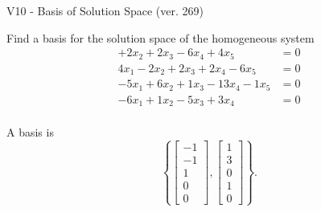 \begin{exercise}
  \begin{exerciseTitle}V10 - Basis of Solution Space (ver. 269)\end{exerciseTitle}
  \begin{exerciseStatement}
    Find a basis for the solution space of the homogeneous system 
\begin{align*}
 + 2 x_ 2 + 2 x_ 3 -6 x_ 4 + 4 x_ 5 &= 0  \\ 
  4 x_ 1 -2 x_ 2 + 2 x_ 3 + 2 x_ 4 -6 x_ 5 &= 0  \\ 
  -5 x_ 1 + 6 x_ 2 + 1 x_ 3 -13 x_ 4 -1 x_ 5 &= 0  \\ 
  -6 x_ 1 + 1 x_ 2 -5 x_ 3 + 3 x_ 4 &= 0  \\ 
 \end{align*}


 
  \end{exerciseStatement}

  \begin{exerciseAnswer}
   A basis is   
\[\left\{\left[\begin{array}{c}
-1 \\
-1 \\
1 \\
0 \\
0
\end{array}\right] , \left[\begin{array}{c}
1 \\
3 \\
0 \\
1 \\
0
\end{array}\right]\right\}.\]

  


  \end{exerciseAnswer}
\end{exercise}